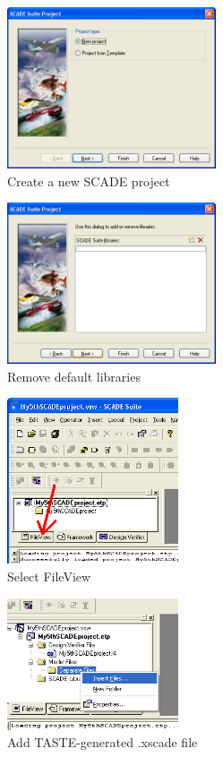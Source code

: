 \documentclass[11pt]{book}
\begin{document}
\begin{figure}
\centering
\includegraphics[width=0.55\textwidth]{imgs/scade1}
\caption{Create a new SCADE project}
\label{scade1}
\end{figure}
\begin{figure}
\centering
\includegraphics[width=0.55\textwidth]{imgs/scade2}
\caption{Remove default libraries}
\label{scade2}
\end{figure}
\begin{figure}
\centering
\includegraphics[width=0.45\textwidth]{imgs/scade3}
\caption{Select FileView}
\label{scade3}
\end{figure}
\begin{figure}
\centering
\includegraphics[width=0.45\textwidth]{imgs/scade4}
\caption{Add TASTE-generated .xscade file}
\label{scade4}
\end{figure}
\end{document}
